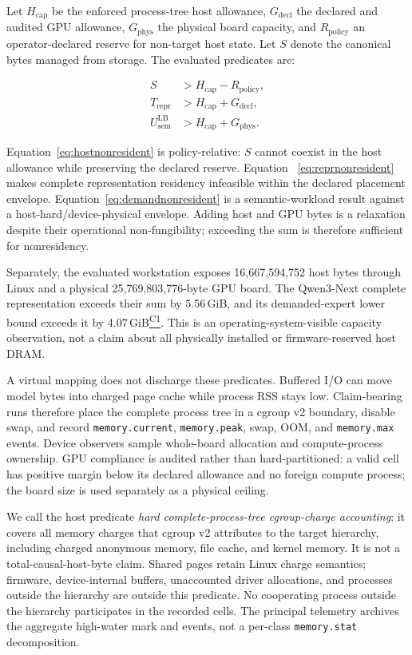 \documentclass[letterpaper,twocolumn,10pt]{article}
\newcommand{\GiB}{\,GiB\xspace}
\newcommand{\claimref}[1]{\hyperlink{claim:#1}{\textsuperscript{\textsf{#1}}}}
\begin{document}
Let $H_{\mathrm{cap}}$ be the enforced process-tree host allowance,
$G_{\mathrm{decl}}$ the declared and audited GPU allowance, $G_{\mathrm{phys}}$
the physical board capacity, and $R_{\mathrm{policy}}$ an operator-declared
reserve for non-target host state.  Let $S$ denote the canonical bytes managed
from storage.  The evaluated predicates are:

\begin{align}
S &> H_{\mathrm{cap}}-R_{\mathrm{policy}},
  \label{eq:hostnonresident}\\
T_{\mathrm{repr}} &> H_{\mathrm{cap}}+G_{\mathrm{decl}},
  \label{eq:reprnonresident}\\
U_{\mathrm{sem}}^{\mathrm{LB}} &>
  H_{\mathrm{cap}}+G_{\mathrm{phys}}.
  \label{eq:demandnonresident}
\end{align}

Equation~\ref{eq:hostnonresident} is policy-relative: $S$ cannot coexist in the
host allowance while preserving the declared reserve.  Equation
~\ref{eq:reprnonresident} makes complete representation residency infeasible
within the declared placement envelope.  Equation~\ref{eq:demandnonresident}
is a semantic-workload result against a host-hard/device-physical envelope.
Adding host and GPU bytes is a relaxation despite their operational
non-fungibility; exceeding the sum is therefore sufficient for nonresidency.

Separately, the evaluated workstation exposes 16,667,594,752 host bytes through
Linux and a physical 25,769,803,776-byte GPU board.  The Qwen3-Next complete
representation exceeds their sum by 5.56\GiB, and its demanded-expert lower
bound exceeds it by 4.07\GiB\claimref{C1}.  This is an operating-system-visible
capacity observation, not a claim about all physically installed or
firmware-reserved host DRAM.

A virtual mapping does not discharge these predicates.  Buffered I/O can move
model bytes into charged page cache while process RSS stays low.  Claim-bearing
runs therefore place the complete process tree in a cgroup v2 boundary,
disable swap, and record \texttt{memory.current}, \texttt{memory.peak}, swap,
OOM, and \texttt{memory.max} events.  Device observers sample whole-board
allocation and compute-process ownership.  GPU compliance is audited rather
than hard-partitioned: a valid cell has positive margin below its declared
allowance and no foreign compute process; the board size is used separately as
a physical ceiling.

We call the host predicate \emph{hard complete-process-tree cgroup-charge
accounting}: it covers all memory charges that cgroup v2 attributes to the
target hierarchy, including charged anonymous memory, file cache, and kernel
memory.  It is not a total-causal-host-byte claim.  Shared pages retain Linux
charge semantics; firmware, device-internal buffers, unaccounted driver
allocations, and processes outside the hierarchy are outside this predicate.
No cooperating process outside the hierarchy participates in the recorded
cells.  The principal telemetry archives the aggregate high-water mark and
events, not a per-class \texttt{memory.stat} decomposition.
\end{document}
